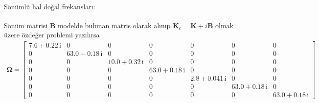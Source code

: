 \documentclass[a4paper]{report}
\begin{document}
~\\
\underline{Sönümlü hal doğal frekansları:}\\
~\\
Sönüm matrisi $\mathbf{B}$ modelde bulunan matris olarak alınıp $\mathbf{K}_c=\mathbf{K}+i\mathbf{B}$ olmak üzere özdeğer problemi yazılırsa
\begin{eqnarray*}
\mathbf{\Omega}=\left[
\begin{array}{ccccccc} 7.6 + 0.22\, \mathrm{i} & 0 & 0 & 0 & 0 & 0 & 0\\ 0 & 63.0 + 0.18\, \mathrm{i} & 0 & 0 & 0 & 0 & 0\\ 0 & 0 & 10.0 + 0.32\, \mathrm{i} & 0 & 0 & 0 & 0\\ 0 & 0 & 0 & 63.0 + 0.18\, \mathrm{i} & 0 & 0 & 0\\ 0 & 0 & 0 & 0 & 2.8 + 0.041\, \mathrm{i} & 0 & 0\\ 0 & 0 & 0 & 0 & 0 & 63.0 + 0.18\, \mathrm{i} & 0\\ 0 & 0 & 0 & 0 & 0 & 0 & 63.0 + 0.18\, \mathrm{i} \end{array}\right]
\end{eqnarray*}
\end{document}
